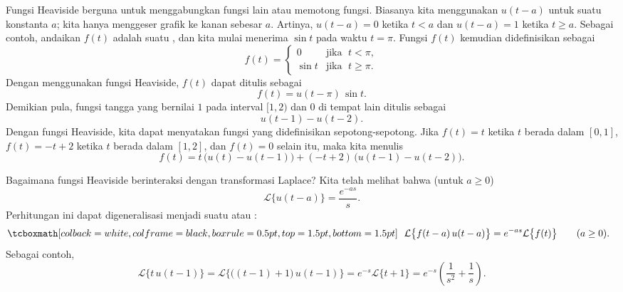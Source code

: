 Fungsi Heaviside berguna untuk
menggabungkan fungsi lain atau memotong fungsi.  Biasanya kita menggunakan
$u(t-a)$ untuk suatu konstanta $a$;  kita hanya menggeser grafik ke
kanan sebesar $a$.  Artinya, $u(t-a) = 0$ ketika $t < a$ dan $u(t-a) = 1$
ketika $t \geq a$.  Sebagai contoh, andaikan $f(t)$ adalah suatu ,
dan kita mulai menerima $\sin t$ pada waktu $t=\pi$.
Fungsi $f(t)$ kemudian didefinisikan sebagai
\begin{equation*}
f(t) =
\begin{cases}
0 & \text{jika } \; t < \pi , \\ 
\sin t & \text{jika } \; t \geq \pi .
\end{cases}
\end{equation*}
Dengan menggunakan fungsi Heaviside, $f(t)$ dapat
ditulis sebagai
\begin{equation*}
f(t) = u(t - \pi) \, \sin t .
\end{equation*}
Demikian pula, fungsi tangga yang bernilai $1$ pada interval $[1,2)$ dan $0$
di tempat lain ditulis sebagai
\begin{equation*}
u(t - 1) - u(t-2) .
\end{equation*}
Dengan fungsi Heaviside, kita dapat menyatakan fungsi yang didefinisikan sepotong-sepotong.
Jika $f(t) = t$ ketika $t$ berada dalam $[0,1]$,
$f(t) = -t+2$
ketika $t$ berada dalam $[1,2]$, dan $f(t) = 0$ selain itu, maka kita menulis
\begin{equation*}
f(t) = t \, \bigl( u(t) - u(t-1) \bigr) + 
(-t+2) \, \bigl( u(t - 1) - u(t-2) \bigr) .
\end{equation*}

Bagaimana fungsi Heaviside berinteraksi dengan transformasi
Laplace?  Kita telah melihat bahwa (untuk $a \geq 0$)
\begin{equation*}
\mathcal{L} \bigl\{ u(t-a) \bigr\} = \frac{e^{-as}}{s} .
\end{equation*}
Perhitungan ini dapat digeneralisasi menjadi suatu \emph{}
atau \emph{}:
\begin{equation} \label{ltd:sseq}
\mybxbg{~~
\mathcal{L} \bigl\{ f(t-a) \, u(t-a) \bigr\}
= e^{-as} \mathcal{L} \bigl\{ f(t) \bigr\}
\qquad (a \geq 0).
~~}
\end{equation}
Sebagai contoh,
\begin{equation*}
\mathcal{L} \bigl\{ t \, u(t-1) \bigr\}
=
\mathcal{L} \bigl\{ \bigl( (t-1) + 1\bigr) \, u(t-1) \bigr\}
= e^{-s} \mathcal{L} \bigl\{ t+1 \bigr\}
= e^{-s} \left(\frac{1}{s^2} + \frac{1}{s} \right)
.
\end{equation*}

